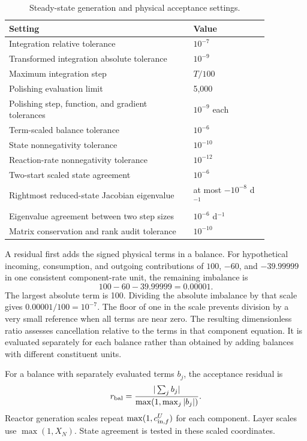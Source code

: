 \begin{table}[htbp]
\centering\small
\caption{Steady-state generation and physical acceptance settings.}\label{tab:plant_generation_settings}
\begin{tabular}{p{0.61\linewidth}p{0.25\linewidth}}
\toprule Setting & Value\\\midrule
Integration relative tolerance & $10^{-7}$\\
Transformed integration absolute tolerance & $10^{-9}$\\
Maximum integration step & $T/100$\\
Polishing evaluation limit & 5{,}000\\
Polishing step, function, and gradient tolerances & $10^{-9}$ each\\
Term-scaled balance tolerance & $10^{-6}$\\
State nonnegativity tolerance & $10^{-10}$\\
Reaction-rate nonnegativity tolerance & $10^{-12}$\\
Two-start scaled state agreement & $10^{-6}$\\
Rightmost reduced-state Jacobian eigenvalue & at most $-10^{-8}$ d$^{-1}$\\
Eigenvalue agreement between two step sizes & $10^{-6}$ d$^{-1}$\\
Matrix conservation and rank audit tolerance & $10^{-10}$\\
\bottomrule
\end{tabular}
\end{table}

A residual first adds the signed physical terms in a balance. For hypothetical incoming, consumption, and outgoing contributions of $100$, $-60$, and $-39.99999$ in one consistent component-rate unit, the remaining imbalance is
\[
100-60-39.99999=0.00001.
\]
The largest absolute term is 100. Dividing the absolute imbalance by that scale gives $0.00001/100=10^{-7}$. The floor of one in the scale prevents division by a very small reference when all terms are near zero. The resulting dimensionless ratio assesses cancellation relative to the terms in that component equation. It is evaluated separately for each balance rather than obtained by adding balances with different constituent units.

For a balance with separately evaluated terms $b_j$, the acceptance residual is
\begin{equation}
r_{\rm bal}=\frac{|\sum_jb_j|}{\max(1,\max_j|b_j|)}.
\label{eq:plant_acceptance_balance}
\end{equation}
Reactor generation scales repeat $\max(1,c_{{\rm in},f}^U)$ for each component. Layer scales use $\max(1,X_N)$. State agreement is tested in these scaled coordinates.

